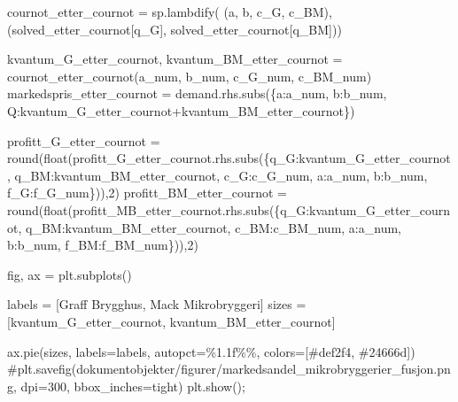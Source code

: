 \documentclass[
  12pt,
  a4paper,
  DIV=11,
  numbers=noendperiod]{scrartcl}
\newenvironment{Shaded}{\begin{snugshade}}{\end{snugshade}}
\newcommand{\BuiltInTok}[1]{\textcolor[rgb]{0.00,0.23,0.31}{#1}}
\newcommand{\CommentTok}[1]{\textcolor[rgb]{0.37,0.37,0.37}{#1}}
\newcommand{\DecValTok}[1]{\textcolor[rgb]{0.68,0.00,0.00}{#1}}
\newcommand{\NormalTok}[1]{\textcolor[rgb]{0.00,0.23,0.31}{#1}}
\newcommand{\OperatorTok}[1]{\textcolor[rgb]{0.37,0.37,0.37}{#1}}
\newcommand{\SpecialCharTok}[1]{\textcolor[rgb]{0.37,0.37,0.37}{#1}}
\newcommand{\StringTok}[1]{\textcolor[rgb]{0.13,0.47,0.30}{#1}}
\begin{document}
\begin{Shaded}
\begin{Highlighting}[]
\NormalTok{cournot\_etter\_cournot }\OperatorTok{=}\NormalTok{ sp.lambdify(}
\NormalTok{    (a, b, c\_G, c\_BM), }
\NormalTok{    (solved\_etter\_cournot[q\_G], solved\_etter\_cournot[q\_BM]))}
    
\NormalTok{kvantum\_G\_etter\_cournot, kvantum\_BM\_etter\_cournot }\OperatorTok{=}\NormalTok{ cournot\_etter\_cournot(a\_num, b\_num, c\_G\_num, c\_BM\_num)}
\NormalTok{markedspris\_etter\_cournot }\OperatorTok{=}\NormalTok{ demand.rhs.subs(\{a:a\_num, b:b\_num, Q:kvantum\_G\_etter\_cournot}\OperatorTok{+}\NormalTok{kvantum\_BM\_etter\_cournot\})}

\NormalTok{profitt\_G\_etter\_cournot }\OperatorTok{=} \BuiltInTok{round}\NormalTok{(}\BuiltInTok{float}\NormalTok{(profitt\_G\_etter\_cournot.rhs.subs(\{q\_G:kvantum\_G\_etter\_cournot, q\_BM:kvantum\_BM\_etter\_cournot, c\_G:c\_G\_num, a:a\_num, b:b\_num, f\_G:f\_G\_num\})),}\DecValTok{2}\NormalTok{)}
\NormalTok{profitt\_BM\_etter\_cournot }\OperatorTok{=} \BuiltInTok{round}\NormalTok{(}\BuiltInTok{float}\NormalTok{(profitt\_MB\_etter\_cournot.rhs.subs(\{q\_G:kvantum\_G\_etter\_cournot, q\_BM:kvantum\_BM\_etter\_cournot, c\_BM:c\_BM\_num, a:a\_num, b:b\_num, f\_BM:f\_BM\_num\})),}\DecValTok{2}\NormalTok{)}
\end{Highlighting}
\end{Shaded}

\begin{Shaded}
\begin{Highlighting}[]
\NormalTok{fig, ax }\OperatorTok{=}\NormalTok{ plt.subplots()}

\NormalTok{labels }\OperatorTok{=}\NormalTok{ [}\StringTok{\textquotesingle{}Graff Brygghus\textquotesingle{}}\NormalTok{, }\StringTok{\textquotesingle{}Mack Mikrobryggeri\textquotesingle{}}\NormalTok{]}
\NormalTok{sizes }\OperatorTok{=}\NormalTok{ [kvantum\_G\_etter\_cournot, kvantum\_BM\_etter\_cournot]}

\NormalTok{ax.pie(sizes, labels}\OperatorTok{=}\NormalTok{labels, autopct}\OperatorTok{=}\StringTok{\textquotesingle{}}\SpecialCharTok{\%1.1f\%\%}\StringTok{\textquotesingle{}}\NormalTok{, colors}\OperatorTok{=}\NormalTok{[}\StringTok{\textquotesingle{}\#def2f4\textquotesingle{}}\NormalTok{, }\StringTok{\textquotesingle{}\#24666d\textquotesingle{}}\NormalTok{])}
\CommentTok{\#plt.savefig(\textquotesingle{}dokumentobjekter/figurer/markedsandel\_mikrobryggerier\_fusjon.png\textquotesingle{}, dpi=300, bbox\_inches=\textquotesingle{}tight\textquotesingle{})}
\NormalTok{plt.show()}\OperatorTok{;}
\end{Highlighting}
\end{Shaded}
\end{document}
